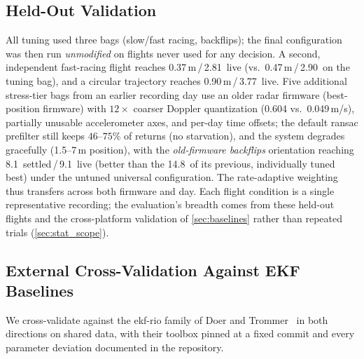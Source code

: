 \subsection{Held-Out Validation}
\label{sec:heldout}
All tuning used three bags (slow/fast racing, backflips); the final
configuration was then run \emph{unmodified} on flights never used for
any decision.  A second, independent fast-racing flight reaches
0.37\,m\,/\,2.81\degree\ live (vs.\ 0.47\,m\,/\,2.90\degree\ on the
tuning bag), and a circular trajectory reaches
0.90\,m\,/\,3.77\degree\ live.
Five additional stress-tier bags from an earlier recording day use an
older radar firmware (best-position firmware) with $12\times$ coarser Doppler quantization
(0.604 vs.\ 0.049\,m/s), partially unusable accelerometer axes, and
per-day time offsets; the default \ac{ransac} prefilter still keeps
$46$--$75\%$ of returns (no starvation), and the system degrades
gracefully (1.5--7\,m position), with the \emph{old-firmware backflips}
orientation reaching 8.1\degree\ settled\,/\,9.1\degree\ live (better
than the 14.8\degree\ of its previous, individually tuned best) under
the untuned universal configuration.  The rate-adaptive weighting thus
transfers across both firmware and day.
Each flight condition is a single representative recording; the
evaluation's breadth comes from these held-out flights and the
cross-platform validation of \autoref{sec:baselines} rather than
repeated trials (\autoref{sec:stat_scope}).

\subsection{External Cross-Validation Against EKF Baselines}
\label{sec:baselines}
We cross-validate against the \ac{ekf}-\ac{rio} family of Doer and
Trommer~\cite{doer2020ekf,doer2021yrio} in both directions on shared
data, with their toolbox pinned at a fixed commit and every parameter
deviation documented in the repository.

